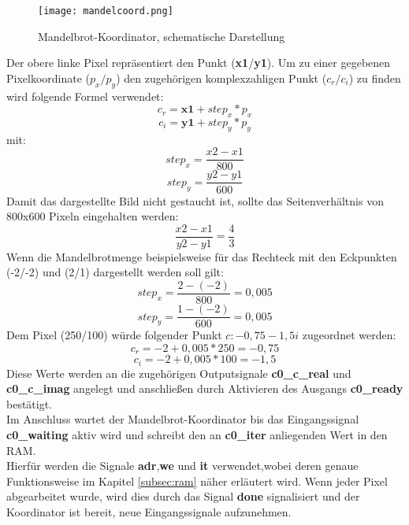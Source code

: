 \documentclass[a4paper,12pt,onesided]{report}
\begin{document}
\begin{figure}[H]
	\centering
	\texttt{[image: mandelcoord.png]}
	\caption{Mandelbrot-Koordinator, schematische Darstellung}
	\label{fig:mandelcoordpixels}
\end{figure}
Der obere linke Pixel repräsentiert den Punkt (\textbf{x1}/\textbf{y1}).
Um zu einer gegebenen Pixelkoordinate ($p_x/p_y$) den zugehörigen komplexzahligen Punkt ($c_r/c_i$) zu finden wird folgende Formel verwendet:
\[c_r = \mathbf{x1} + step_x * p_x\] 
\[c_i = \mathbf{y1} + step_y * p_y\]
mit:
\[step_x = \frac{x2-x1}{800}\]
\[step_y = \frac{y2-y1}{600}\]
Damit das dargestellte Bild nicht gestaucht ist, sollte das Seitenverhältnis von 800x600 Pixeln eingehalten werden:
\[\frac{x2-x1}{y2-y1}=\frac{4}{3}\]
Wenn die Mandelbrotmenge beispielsweise für das Rechteck mit den Eckpunkten (-2/-2) und (2/1) dargestellt werden soll gilt:
\[step_x = \frac{2-(-2)}{800} = 0,005\]
\[step_y = \frac{1-(-2)}{600} = 0,005\]
Dem Pixel (250/100) würde folgender Punkt $c: -0,75 -1,5i$ zugeordnet werden:
\[c_r = -2 + 0,005 * 250 = -0,75\] 
\[c_i = -2 + 0,005 * 100 = -1,5\]
Diese Werte werden an die zugehörigen Outputsignale \textbf{c0\_c\_real} und \textbf{c0\_c\_imag} angelegt und anschließen durch Aktivieren des Ausgangs \textbf{c0\_ready} bestätigt.\\
Im Anschluss wartet der Mandelbrot-Koordinator bis das Eingangssignal \textbf{c0\_waiting} aktiv wird und schreibt den an \textbf{c0\_iter} anliegenden Wert in den RAM.\\
Hierfür werden die Signale \textbf{adr},\textbf{we} und \textbf{it} verwendet,wobei deren genaue Funktionsweise im Kapitel \autoref{subsec:ram} näher erläutert wird.
Wenn jeder Pixel abgearbeitet wurde, wird dies durch das Signal \textbf{done} signalisiert und der Koordinator ist bereit, neue Eingangssignale aufzunehmen.\\
\end{document}
